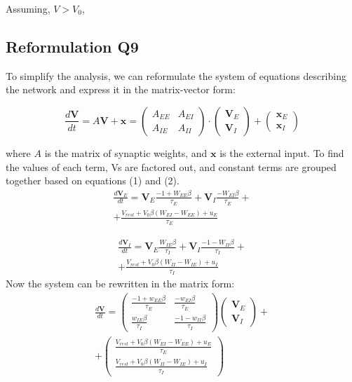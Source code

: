 \documentclass[10pt,twocolumn]{article}
\begin{document}
Assuming, $V > V_0$,

\subsection{Reformulation Q9}
To simplify the analysis, we can reformulate the system
of equations describing the network and
express it in the matrix-vector form:

$$
    \frac{d\textbf{V}}{dt}
    = A\textbf{V} + \textbf{x}
    =
    \begin{pmatrix}
        A_{EE} & A_{EI} \\
        A_{IE} & A_{II}
    \end{pmatrix}
    \cdot \begin{pmatrix} \textbf{V}_E \\ \textbf{V}_I \end{pmatrix}
    + \begin{pmatrix} \textbf{x}_E \\ \textbf{x}_I \end{pmatrix}
$$

where $A$ is the matrix of synaptic weights,
and $\textbf{x}$ is the external input.
To find the values of each term, Vs are factored out, and
constant terms are grouped together based on equations (1) and (2).
$$
    \begin{align*}
        \frac{d\textbf{V}_E}{dt}
        = \textbf{V}_E \boxed{\frac{-1 + W_{EE}\beta}{\tau_E}}
        + \textbf{V}_I \boxed{\frac{-W_{EI}\beta}{\tau_E}}+
        \\
        + \boxed{\frac{V_{rest} + V_0\beta(W_{EI}-W_{EE}) + u_E}{\tau_E}}
    \end{align*}
$$

$$
    \begin{align*}
        \frac{d\textbf{V}_I}{dt}
        = \textbf{V}_E\boxed{\frac{W_{IE}\beta}{\tau_I}}
        + \textbf{V}_I\boxed{\frac{-1 - W_{II}\beta}{\tau_I}}+
        \\
        + \boxed{\frac{V_{rest} + V_0\beta(W_{II}-W_{IE}) + u_I}{\tau_I}}
    \end{align*}
$$
Now the system can be rewritten in the matrix form:
$$
    \begin{align*}
        \frac{d\textbf{V}}{dt}
        =
        \begin{pmatrix}
            \frac{-1 + w_{EE}\beta}{\tau_E} & \frac{-w_{EI}\beta}{\tau_E}     \\
            \frac{w_{IE}\beta}{\tau_I}      & \frac{-1 - w_{II}\beta}{\tau_I}
        \end{pmatrix}
        \begin{pmatrix}
            \textbf{V}_E \\ \textbf{V}_I
        \end{pmatrix}+
        \\
        +
        \begin{pmatrix}
            \frac{V_{rest} + V_0\beta(W_{EI}-W_{EE}) + u_E}{\tau_E} \\
            \frac{V_{rest} + V_0\beta(W_{II}-W_{IE}) + u_I}{\tau_I}
        \end{pmatrix}
    \end{align*}
$$
\end{document}

